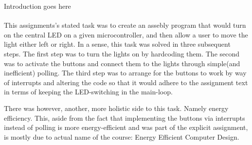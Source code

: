Introduction goes here\\\\
This assignments's stated task was to create an assebly program that would turn on the central LED on a given microcontroller, and then allow a user to move the light either left or right.
In a sense, this task was solved in three subsequent steps. The first step was to turn the lights on by hardcoding them. The second was to activate the buttons and connect them to the lights through simple(and inefficient) polling. The third step was to arrange for the buttons to work by way of interrupts and altering the code so that it would adhere to the assignment text in terms of keeping the LED-switching in the main-loop.

There was however, another, more holistic side to this task. Namely energy efficiency. This, aside from the fact that implementing the buttons via interrupts instead of polling is more energy-efficient and was part of the explicit assignment, is mostly due to actual name of the course: Energy Efficient Computer Design.

